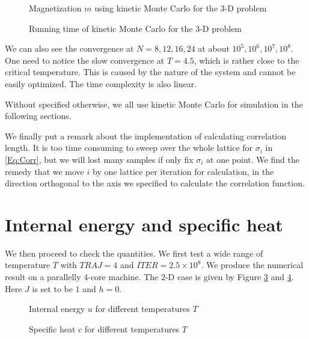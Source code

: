 \documentclass[english, nochinese]{pnote}
\begin{document}
\begin{figure}[htbp]
\centering
\scalebox{0.725}{}
\caption{Magnetization $m$ using kinetic Monte Carlo for the 3-D problem}
\label{Fig:3DKMC}
\end{figure}

\begin{figure}[htbp]
\centering
\scalebox{0.725}{}
\caption{Running time of kinetic Monte Carlo for the 3-D problem}
\label{Fig:3DTime}
\end{figure}

We can also see the convergence at $ N = 8, 12, 16, 24 $ at about $ 10^5, 10^6, 10^7, 10^8 $. One need to notice the slow convergence at $ T = 4.5 $, which is rather close to the critical temperature. This is caused by the nature of the system and cannot be easily optimized. The time complexity is also linear.

Without specified otherwise, we all use kinetic Monte Carlo for simulation in the following sections.

We finally put a remark about the implementation of calculating correlation length. It is too time consuming to sweep over the whole lattice for $\sigma_i$ in \eqref{Eq:Corr}, but we will lost many samples if only fix $\sigma_i$ at one point. We find the remedy that we move $i$ by one lattice per iteration for calculation, in the direction orthogonal to the axis we specified to calculate the correlation function.

\section{Internal energy and specific heat}

We then proceed to check the quantities. We first test a wide range of temperature $T$ with $ \mathit{TRAJ} = 4 $ and $ \mathit{ITER} = 2.5 \times 10^8 $. We produce the numerical result on a parallelly 4-core machine. The 2-D case is given by Figure \ref{Fig:HeatSmall} and \ref{Fig:CapSmall}. Here $J$ is set to be $1$ and $ h = 0 $.

\begin{figure}[htbp]
\centering
\scalebox{0.725}{}
\caption{Internal energy $u$ for different temperatures $T$}
\label{Fig:HeatSmall}
\end{figure}

\begin{figure}[htbp]
\centering
\scalebox{0.725}{}
\caption{Specific heat $c$ for different temperatures $T$}
\label{Fig:CapSmall}
\end{figure}
\end{document}
